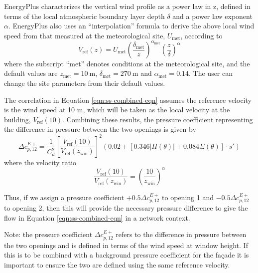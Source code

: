 EnergyPlus characterizes the vertical wind profile as a power law in z, defined in terms of the local atmospheric boundary layer depth $\delta$ and a power law exponent $\alpha$. EnergyPlus also uses an ``interpolation'' formula to derive the above local wind speed from that measured at the meteorological site, $U_\text{met}$, according to
\begin{equation}
V_\text{ref}(z)= U_\text{met} \left(\frac{\delta_\text{met}}{z}\right)^{\alpha_\text{met}}
\left(\frac{z}{\delta}\right)^\alpha
\end{equation}
where the subscript ``met'' denotes conditions at the meteorological site, and the default values are $z_\text{met} = 10\ \text{m}$, $\delta_\text{met} = 270\ \text{m}$ and $\alpha_\text{met} = 0.14$. The user can change the site parameters from their default values.

The correlation in Equation \ref{eqn:ss-combined-eqn} assumes the reference velocity is the wind speed at 10 m, which will be taken as the local velocity at the building, $V_\text{ref}(10)$.
Combining these results, the pressure coefficient representing the difference in pressure between the two openings is given by
\begin{equation}
\Delta c_{p,12}^{E+} = \frac{1}{C_d^2} \left[ \frac{V_\text{ref}(10)}{V_\text{ref}(z_\text{win})} \right]^2 \left(0.02+\left[0.346 |\Pi(\theta)|+0.084 \Sigma(\theta)\right]{\cdot}s'\right)
\end{equation}
where the velocity ratio
\begin{equation}
\frac{V_\text{ref}(10)}{V_\text{ref}(z_\text{win})} = \left(\frac{10}{z_\text{win}}\right)^\alpha
\end{equation}

Thus, if we assign a pressure coefficient $+0.5\Delta c_{p,12}^{E+}$ to opening 1 and $-0.5\Delta c_{p,12}^{E+}$ to opening 2, then this will provide the necessary pressure difference to give the flow in Equation \ref{eqn:ss-combined-eqn} in a network context.

Note: the pressure coefficient $\Delta c_{p,12}^{E+}$ refers to the difference in pressure between the two openings and is defined in terms of the wind speed at window height. If this is to be combined with a background pressure coefficient for the fa\c{c}ade it is important to ensure the two are defined using the same reference velocity.

